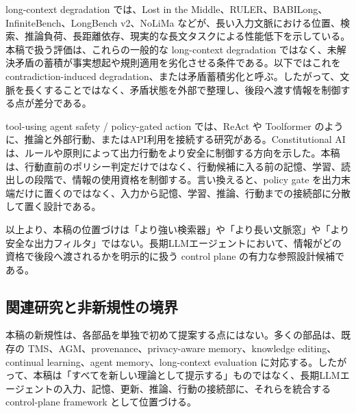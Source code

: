 \documentclass[12pt,a4paper]{article}
\begin{document}
long-context degradation では、Lost in the Middle、RULER、BABILong、InfiniteBench、LongBench v2、NoLiMa などが、長い入力文脈における位置、検索、推論負荷、長距離依存、現実的な長文タスクによる性能低下を示している。本稿で扱う評価は、これらの一般的な long-context degradation ではなく、未解決矛盾の蓄積が事実想起や規則適用を劣化させる条件である。以下ではこれを contradiction-induced degradation、または矛盾蓄積劣化と呼ぶ。したがって、文脈を長くすることではなく、矛盾状態を外部で整理し、後段へ渡す情報を制御する点が差分である。

tool-using agent safety / policy-gated action では、ReAct や Toolformer のように、推論と外部行動、またはAPI利用を接続する研究がある。Constitutional AI は、ルールや原則によって出力行動をより安全に制御する方向を示した。本稿は、行動直前のポリシー判定だけではなく、行動候補に入る前の記憶、学習、読出しの段階で、情報の使用資格を制御する。言い換えると、policy gate を出力末端だけに置くのではなく、入力から記憶、学習、推論、行動までの接続部に分散して置く設計である。

以上より、本稿の位置づけは「より強い検索器」や「より長い文脈窓」や「より安全な出力フィルタ」ではない。長期LLMエージェントにおいて、情報がどの資格で後段へ渡されるかを明示的に扱う control plane の有力な参照設計候補である。

\subsection{関連研究と非新規性の境界}\label{ux95a2ux9023ux7814ux7a76ux3068ux975eux65b0ux898fux6027ux306eux5883ux754c}

本稿の新規性は、各部品を単独で初めて提案する点にはない。多くの部品は、既存の TMS、AGM、provenance、privacy-aware memory、knowledge editing、continual learning、agent memory、long-context evaluation に対応する。したがって、本稿は「すべてを新しい理論として提示する」ものではなく、長期LLMエージェントの入力、記憶、更新、推論、行動の接続部に、それらを統合する control-plane framework として位置づける。
\end{document}
